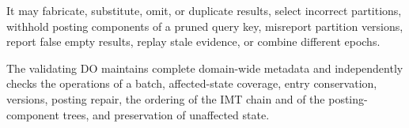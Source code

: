 It may fabricate, substitute, omit, or duplicate results, select incorrect partitions, withhold posting
components of a pruned query key, misreport partition versions, report false empty results, replay stale
evidence, or combine different epochs.


The validating DO maintains complete domain-wide metadata and independently checks the operations of a
batch, affected-state coverage, entry conservation, versions, posting repair, the ordering of the IMT
chain and of the posting-component trees, and preservation of unaffected state.




